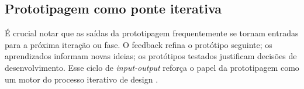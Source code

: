 \subsection{Prototipagem como ponte iterativa}

É crucial notar que as saídas da prototipagem frequentemente se tornam entradas para a próxima iteração ou fase. O feedback refina o protótipo seguinte; os aprendizados informam novas ideias; os protótipos testados justificam decisões de desenvolvimento. Esse ciclo de \textit{input-output} reforça o papel da prototipagem como um motor do processo iterativo de design \cite{paust2025integrative, leinonen2023service}.


 
